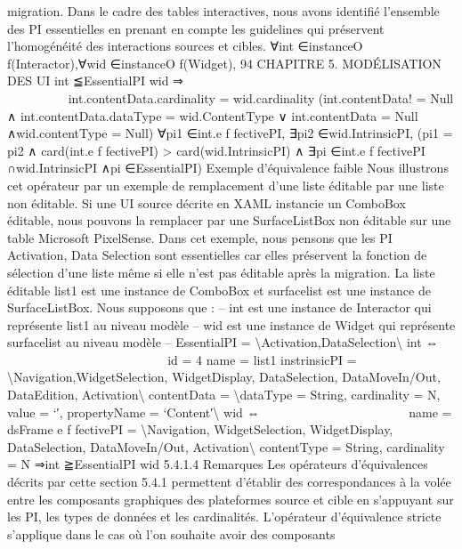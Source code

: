 \documentclass{article}
\begin{document}
migration. Dans le cadre des tables interactives, nous avons identiﬁ\'{e} l’ensemble des PI essentielles en
prenant en compte les guidelines qui pr\'{e}servent l’homog\'{e}n\'{e}it\'{e} des interactions sources et cibles.
∀int ∈instanceO f(Interactor),∀wid ∈instanceO f(Widget),
94
CHAPITRE 5. MODÉLISATION DES UI
int ≦EssentialPI wid ⇒











































int.contentData.cardinality = wid.cardinality
(int.contentData! = Null
∧
int.contentData.dataType = wid.ContentType
∨
int.contentData = Null ∧wid.contentType = Null)
∀pi1 ∈int.e f fectivePI,
∃pi2 ∈wid.IntrinsicPI,
(pi1 = pi2
∧
card(int.e f fectivePI) > card(wid.IntrinsicPI)
∧
∃pi ∈int.e f fectivePI ∩wid.IntrinsicPI ∧pi ∈EssentialPI)
Exemple d’\'{e}quivalence faible
Nous illustrons cet op\'{e}rateur par un exemple de remplacement d’une
liste \'{e}ditable par une liste non \'{e}ditable. Si une UI source d\'{e}crite en XAML instancie un ComboBox
\'{e}ditable, nous pouvons la remplacer par une SurfaceListBox non \'{e}ditable sur une table Microsoft
PixelSense. Dans cet exemple, nous pensons que les PI Activation, Data Selection sont essentielles car
elles pr\'{e}servent la fonction de s\'{e}lection d’une liste m\^{e}me si elle n’est pas \'{e}ditable apr\`{e}s la migration.
La liste \'{e}ditable list1 est une instance de ComboBox et surfacelist est une instance de SurfaceListBox. Nous supposons que :
– int est une instance de Interactor qui repr\'{e}sente list1 au niveau mod\`{e}le
– wid est une instance de Widget qui repr\'{e}sente surfacelist au niveau mod\`{e}le
– EssentialPI = \textbackslash{}{Activation,DataSelection\textbackslash{}}
int ⇔























id = 4
name = list1
instrinsicPI = \textbackslash{}{Navigation,WidgetSelection,
WidgetDisplay, DataSelection,
DataMoveIn/Out,
DataEdition, Activation\textbackslash{}}
contentData = \textbackslash{}{dataType = String, cardinality = N,
value = ‘′, propertyName = ‘Content′\textbackslash{}}
wid ⇔



















name = dsFrame
e f fectivePI = \textbackslash{}{Navigation, WidgetSelection,
WidgetDisplay, DataSelection,
DataMoveIn/Out,
Activation\textbackslash{}}
contentType = String,
cardinality = N
⇒int ≧EssentialPI wid
5.4.1.4
Remarques
Les op\'{e}rateurs d’\'{e}quivalences d\'{e}crits par cette section 5.4.1 permettent d’\'{e}tablir des correspondances \`{a} la vol\'{e}e entre les composants graphiques des plateformes source et cible en s’appuyant sur
les PI, les types de donn\'{e}es et les cardinalit\'{e}s.
L’op\'{e}rateur d’\'{e}quivalence stricte s’applique dans le cas o\`{u} l’on souhaite avoir des composants
\end{document}
